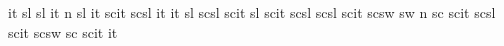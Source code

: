   {it}  {sl}
  {sl}  {it}
 {n}   {}
%
  {sl}    {it}
  {scit}  {scsl}
 {it}    {}
%
  {it}    {sl}
  {scsl}  {scit}
 {sl}    {}
%
  {scit}  {scsl}
  {scsl}  {scit}
  {scsw}  {sw}   
 {n}     {}
%
   {sc}    {}
  {scit}  {}
  {scsl}  {scit}
  {scsw}  {sc}    %
  {scit}  {}
 {it}    {}

